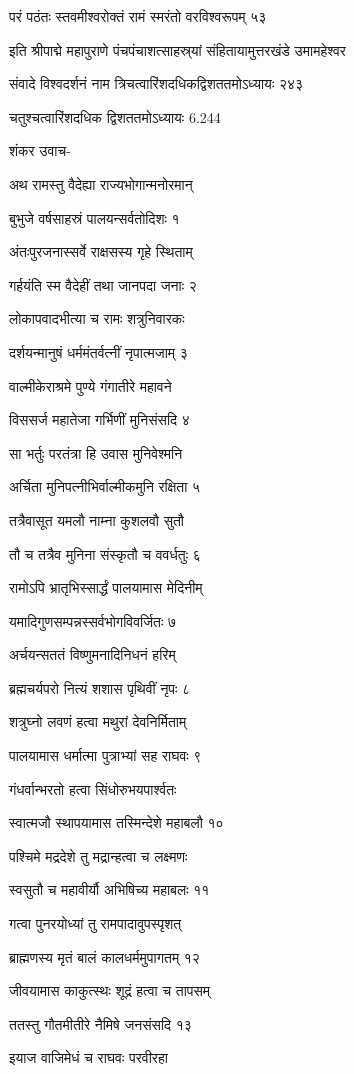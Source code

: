 परं पठंतः स्तवमीश्वरोक्तं रामं स्मरंतो वरविश्वरूपम् ५३

इति श्रीपाद्मे महापुराणे पंचपंचाशत्साहस्र्यां संहितायामुत्तरखंडे उमामहेश्वर

संवादे विश्वदर्शनं नाम त्रिचत्वारिंशदधिकद्विशततमोऽध्यायः २४३

चतुश्चत्वारिंशदधिक द्विशततमोऽध्यायः 6.244

शंकर उवाच-

अथ रामस्तु वैदेह्या राज्यभोगान्मनोरमान्

बुभुजे वर्षसाहस्रं पालयन्सर्वतोदिशः १

अंतःपुरजनास्सर्वे राक्षसस्य गृहे स्थिताम्

गर्हयंति स्म वैदेहीं तथा जानपदा जनाः २

लोकापवादभीत्या च रामः शत्रुनिवारकः

दर्शयन्मानुषं धर्ममंतर्वत्नीं नृपात्मजाम् ३

वाल्मीकेराश्रमे पुण्ये गंगातीरे महावने

विससर्ज महातेजा गर्भिणीं मुनिसंसदि ४

सा भर्तुः परतंत्रा हि उवास मुनिवेश्मनि

अर्चिता मुनिपत्नीभिर्वाल्मीकमुनि रक्षिता ५

तत्रैवासूत यमलौ नाम्ना कुशलवौ सुतौ

तौ च तत्रैव मुनिना संस्कृतौ च ववर्धतुः ६

रामोऽपि भ्रातृभिस्सार्द्धं पालयामास मेदिनीम्

यमादिगुणसम्पन्नस्सर्वभोगविवर्जितः ७

अर्चयन्सततं विष्णुमनादिनिधनं हरिम्

ब्रह्मचर्यपरो नित्यं शशास पृथिवीं नृपः ८

शत्रुघ्नो लवणं हत्वा मथुरां देवनिर्मिताम्

पालयामास धर्मात्मा पुत्राभ्यां सह राघवः ९

गंधर्वान्भरतो हत्वा सिंधोरुभयपार्श्वतः

स्वात्मजौ स्थापयामास तस्मिन्देशे महाबलौ १०

पश्चिमे मद्रदेशे तु मद्रान्हत्वा च लक्ष्मणः

स्वसुतौ च महावीर्यौ अभिषिच्य महाबलः ११

गत्वा पुनरयोध्यां तु रामपादावुपस्पृशत्

ब्राह्मणस्य मृतं बालं कालधर्ममुपागतम् १२

जीवयामास काकुत्स्थः शूद्रं हत्वा च तापसम्

ततस्तु गौतमीतीरे नैमिषे जनसंसदि १३

इयाज वाजिमेधं च राघवः परवीरहा


